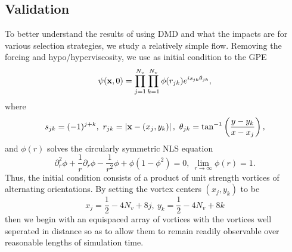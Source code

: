 \documentclass[a4paper,11pt]{article}
\newcommand{\pd}{\partial}
\begin{document}
\subsection*{Validation}
To better understand the results of using DMD and what the impacts are for various selection strategies, we study a relatively simple flow.  Removing the forcing and hypo/hyperviscosity, we use as initial condition to the GPE
\[
\psi({\bf x},0) = \prod_{j=1}^{N_{v}}\prod_{k=1}^{N_{v}} \phi(r_{jk})e^{is_{jk}\theta_{jk}}, 
\]
where
\[
s_{jk} = (-1)^{j+k}, ~ r_{jk} = \left|{\bf x} - (x_{j},y_{k}) \right|, ~ \theta_{jk} = \tan^{-1}\left(\frac{y-y_{k}}{x-x_{j}} \right),
\]
and $\phi(r)$ solves the circularly symmetric NLS equation
\[
\pd_{r}^{2}\phi  + \frac{1}{r}\pd_{r}\phi - \frac{1}{r^{2}}\phi + \phi(1-\phi^{2}) = 0, ~ \lim_{r\rightarrow\infty} \phi(r) = 1.
\]
Thus, the initial condition consists of a product of unit strength vortices of alternating orientations.  By setting the vortex centers $(x_{j},y_{k})$ to be 
\[
x_{j} = \frac{1}{2} - 4N_{v} + 8j, ~ y_{k} = \frac{1}{2}-4N_{v} + 8k 
\]
then we begin with an equispaced array of vortices with the vortices well seperated in distance so as to allow them to remain readily observable over reasonable lengths of simulation time.  
\end{document}
